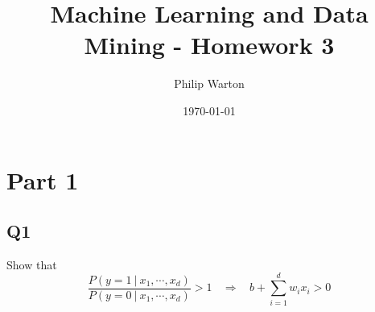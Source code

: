 \documentclass{article}
\theoremstyle{definition}
\begin{document}
\title{Machine Learning and Data Mining - Homework 3}
\author{Philip Warton}
\date{\today}
\maketitle
\section*{Part 1}
    \subsection*{Q1}
        \begin{mdframed}[]
            Show that
            \[
                \frac{P(y=1 \ | \ x_1, \cdots , x_d)}{P(y=0 \ | \ x_1, \cdots, x_d)} > 1 
                \ \ \ \ \Longrightarrow \ \ \ \ 
                b + \sum_{i=1}^dw_ix_i > 0   
            \]
        \end{mdframed}
\end{document}
